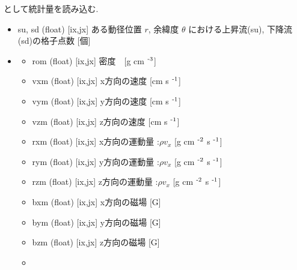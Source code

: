 \documentclass[letterpaper,10pt,dvipdfmx,report]{sphinxmanual}
\begin{document}
\sphinxAtStartPar
として統計量を読み込む.
\begin{itemize}
\item {} 
\sphinxAtStartPar
su, sd (float) {[}ix,jx{]} \sphinxhyphen{}\sphinxhyphen{} ある動径位置 \(r\), 余緯度 \(\theta\) における上昇流(su), 下降流(sd)の格子点数 {[}個{]}

\item {} \begin{description}
\begin{itemize}
\item {} 
\sphinxAtStartPar
rom (float) {[}ix,jx{]} \sphinxhyphen{}\sphinxhyphen{} 密度　{[}g cm $^{\text{\mbox{-}3}}${]}

\item {} 
\sphinxAtStartPar
vxm (float) {[}ix,jx{]} \sphinxhyphen{}\sphinxhyphen{} x方向の速度 {[}cm s $^{\text{\mbox{-}1}}${]}

\item {} 
\sphinxAtStartPar
vym (float) {[}ix,jx{]} \sphinxhyphen{}\sphinxhyphen{} y方向の速度 {[}cm s $^{\text{\mbox{-}1}}${]}

\item {} 
\sphinxAtStartPar
vzm (float) {[}ix,jx{]} \sphinxhyphen{}\sphinxhyphen{} z方向の速度 {[}cm s $^{\text{\mbox{-}1}}${]}

\item {} 
\sphinxAtStartPar
rxm (float) {[}ix,jx{]} \sphinxhyphen{}\sphinxhyphen{} x方向の運動量 :\(\rho v_x\)  {[}g cm $^{\text{\mbox{-}2}}$ s $^{\text{\mbox{-}1}}${]}

\item {} 
\sphinxAtStartPar
rym (float) {[}ix,jx{]} \sphinxhyphen{}\sphinxhyphen{} y方向の運動量 :\(\rho v_x\)  {[}g cm $^{\text{\mbox{-}2}}$ s $^{\text{\mbox{-}1}}${]}

\item {} 
\sphinxAtStartPar
rzm (float) {[}ix,jx{]} \sphinxhyphen{}\sphinxhyphen{} z方向の運動量 :\(\rho v_x\)  {[}g cm $^{\text{\mbox{-}2}}$ s $^{\text{\mbox{-}1}}${]}

\item {} 
\sphinxAtStartPar
bxm (float) {[}ix,jx{]} \sphinxhyphen{}\sphinxhyphen{} x方向の磁場 {[}G{]}

\item {} 
\sphinxAtStartPar
bym (float) {[}ix,jx{]} \sphinxhyphen{}\sphinxhyphen{} y方向の磁場 {[}G{]}

\item {} 
\sphinxAtStartPar
bzm (float) {[}ix,jx{]} \sphinxhyphen{}\sphinxhyphen{} z方向の磁場 {[}G{]}

\item {} 
\end{itemize}

\end{description}

\end{itemize}
\end{document}

